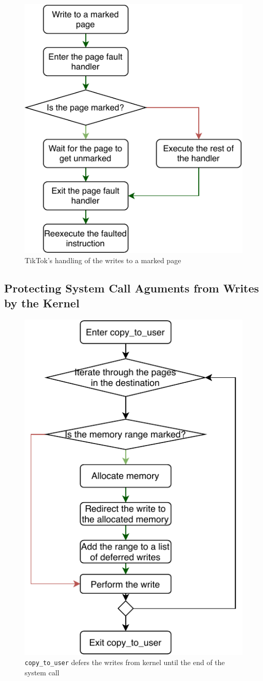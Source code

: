 \begin{figure}[]
  \centering
  \includegraphics[width = .75 \linewidth]{img/pagefault.pdf}
  \caption{TikTok's handling of the writes to a marked page}
  \label{fig:pagefault}
\end{figure}

\subsection{Protecting System Call Aguments from Writes by the Kernel}
\label{subsec:kernelland}
\begin{figure}[]
  \centering
  \includegraphics[width = .30 \textwidth]{img/copy_to_user.pdf}
  \caption{\texttt{copy\_to\_user} defers the writes from kernel until the end of the system call}
  \label{fig:copytouser}
\end{figure}

